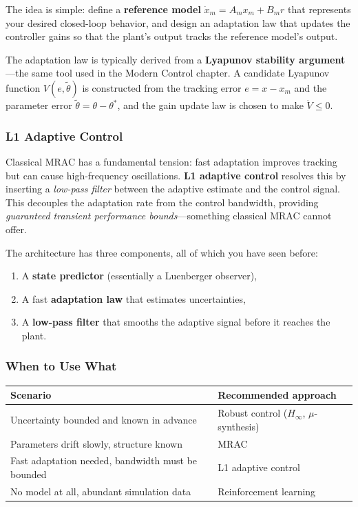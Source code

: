 The idea is simple: define a \textbf{reference model} $\dot{x}_m = A_m x_m + B_m r$ that represents your desired closed-loop behavior, and design an adaptation law that updates the controller gains so that the plant's output tracks the reference model's output.

The adaptation law is typically derived from a \textbf{Lyapunov stability argument}---the same tool used in the Modern Control chapter. A candidate Lyapunov function $V(e, \tilde{\theta})$ is constructed from the tracking error $e = x - x_m$ and the parameter error $\tilde{\theta} = \theta - \theta^*$, and the gain update law is chosen to make $\dot{V} \leq 0$.

\subsubsection{L1 Adaptive Control}

Classical MRAC has a fundamental tension: fast adaptation improves tracking but can cause high-frequency oscillations. \textbf{L1 adaptive control} resolves this by inserting a \emph{low-pass filter} between the adaptive estimate and the control signal. This decouples the adaptation rate from the control bandwidth, providing \emph{guaranteed transient performance bounds}---something classical MRAC cannot offer.

The architecture has three components, all of which you have seen before:
\begin{enumerate}[nosep]
    \item A \textbf{state predictor} (essentially a Luenberger observer),
    \item A fast \textbf{adaptation law} that estimates uncertainties,
    \item A \textbf{low-pass filter} that smooths the adaptive signal before it reaches the plant.
\end{enumerate}

\subsubsection{When to Use What}

\begin{center}
\small
\begin{tabular}{l l}
\toprule
\textbf{Scenario} & \textbf{Recommended approach} \\
\midrule
Uncertainty bounded and known in advance & Robust control ($H_\infty$, $\mu$-synthesis) \\
Parameters drift slowly, structure known & MRAC \\
Fast adaptation needed, bandwidth must be bounded & L1 adaptive control \\
No model at all, abundant simulation data & Reinforcement learning \\
\bottomrule
\end{tabular}
\end{center}

